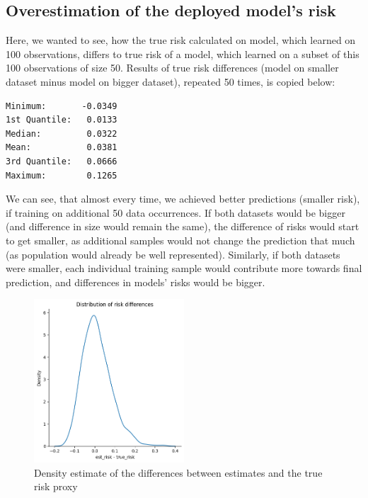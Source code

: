 \documentclass{article}
\begin{document}
\subsection{Overestimation of the deployed model’s risk}

Here, we wanted to see, how the true risk calculated on model, which learned on 100 observations, differs to true risk of a model, which learned on a subset of this 100 observations of size 50. Results of true risk differences (model on smaller dataset minus model on bigger dataset), repeated 50 times, is copied below:

\begin{lstlisting}[basicstyle=\small\ttfamily]
Minimum:       -0.0349
1st Quantile:   0.0133
Median:         0.0322      
Mean:           0.0381        
3rd Quantile:   0.0666
Maximum:        0.1265  
\end{lstlisting}

We can see, that almost every time, we achieved better predictions (smaller risk), if training on additional 50 data occurrences. If both datasets would be bigger (and difference in size would remain the same), the difference of risks would start to get smaller, as additional samples would not change the prediction that much (as population would already be well represented). Similarly, if both datasets were smaller, each individual training sample would contribute more towards final prediction, and differences in models' risks would be bigger.

\begin{figure}[!h]
    \centering
    \includegraphics[width=0.5\textwidth]{homework-02/plots/risk_differences_2.png}
    \caption{Density estimate of the differences between estimates and the true risk proxy}
    \label{fig:risk_differences_2}
\end{figure}
\end{document}
